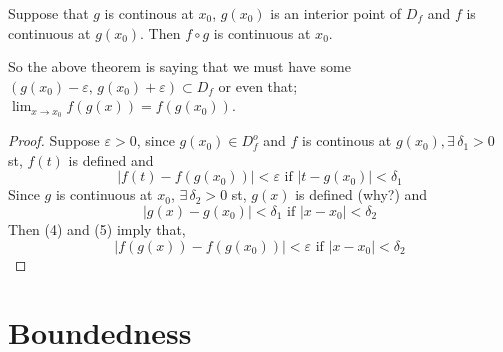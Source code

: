 \documentclass{article}
\newcommand{\sub}{\subset}
\renewcommand{\d}{\delta}
\newcommand{\e}{\varepsilon}
\newcommand{\ex}{\exists\,}
\begin{document}
{{\begin{theorem}{}{}
  Suppose that $g$ is continous at $x_0$, $g(x_0)$ is an interior point of $D_f$ and $f$ is continuous at $g(x_0)$. Then $f\circ g$ is continuous at $x_0$.
\end{theorem}
\begin{figure}[H]
\end{figure}

So the above theorem is saying that we must have some $(g(x_0) - \e,\, g(x_0) + \e) \sub D_f$ or even that; $\displaystyle{\lim_{x\to x_0}{f(g(x))} = f(g(x_0))}$.

\begin{proof}
  Suppose $\e>0$, since $g(x_0)\in D_f^o$ and $f$ is continous at $g(x_0), \ex\d_1>0$ st, $f(t)$ is defined and
  \begin{equation}
    |f(t) - f(g(x_0))|<\e \text{ if } |t - g(x_0)| < \d_1
  \end{equation}
  Since $g$ is continuous at $x_0$, $\ex\d_2>0$ st, $g(x)$ is defined (why?) and
  \begin{equation}
    |g(x) - g(x_0)| < \d_1 \text{ if } |x - x_0|<\d_2
  \end{equation}
  Then (4) and (5) imply that,
  $$ |f(g(x)) - f(g(x_0))| < \e \text{ if } |x - x_0| < \d_2 $$

\end{proof}

\newpage
\newpage\section{Boundedness}

}}
\end{document}
